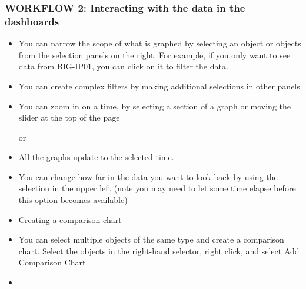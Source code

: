 \documentclass[letterpaper,10pt,english]{sphinxmanual}
\begin{document}
\subsubsection{WORKFLOW 2: Interacting with the data in the dashboards}
\label{\detokenize{class1/module4/lab6:workflow-2-interacting-with-the-data-in-the-dashboards}}\begin{itemize}
\item {} 
You can narrow the scope of what is graphed by selecting an object
or objects from the selection panels on the right. For example, if
you only want to see data from BIG-IP01, you can click on it to
filter the data.


\item {} 
You can create complex filters by making additional selections in
other panels

\item {} 
You can zoom in on a time, by selecting a section of a graph or
moving the slider at the top of the page


or


\item {} 
All the graphs update to the selected time.

\item {} 
You can change how far in the data you want to look back by using
the selection in the upper left (note you may need to let some time
elapse before this option becomes available)


\item {} 
Creating a comparison chart

\item {} 
You can select multiple objects of the same type and create a
comparison chart. Select the objects in the right-hand selector,
right click, and select Add Comparison Chart


\item {} 


\end{itemize}
\end{document}
